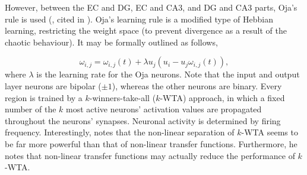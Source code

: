 However, between the EC and DG, EC and CA3, and DG and CA3 parts, Oja's rule is used (\cite{Hertz1991}, cited in \cite{Hattori2014}). Oja's learning rule is a modified type of Hebbian learning, restricting the weight space (to prevent divergence as a result of the chaotic behaviour). It may be formally outlined as follows,

\begin{equation}\label{ojas_rule}
    \omega_{i,j} = \omega_{i,j}(t) + \lambda u_j (u_i - u_j \omega_{i,j}(t)),
\end{equation}
where $\lambda$ is the learning rate for the Oja neurons. Note that the input and output layer neurons are bipolar ($\pm 1$), whereas the other neurons are binary. Every region is trained by a $k$-winners-take-all ($k$-WTA) approach, in which a fixed number of the $k$ most active neurons' activation values are propagated throughout the neurons' synapses. Neuronal activity is determined by firing frequency. Interestingly, \citep{Hattori2014} notes that the non-linear separation of $k$-WTA seems to be far more powerful than that of non-linear transfer functions. Furthermore, he notes that non-linear transfer functions may actually reduce the performance of $k$-WTA.

